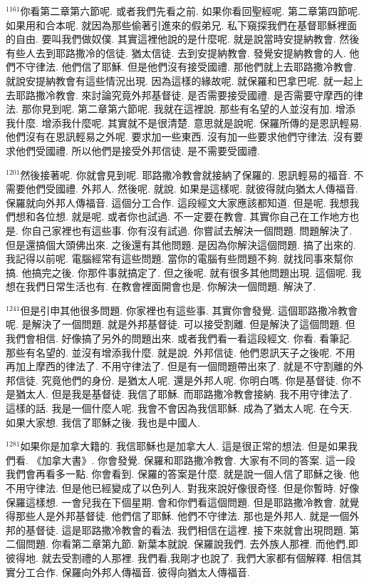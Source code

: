\documentclass{book}
\begin{document}
$^{1161}$你看第二章第六節呢.
或者我們先看之前.
如果你看回聖經呢.
第二章第四節呢.
如果用和合本呢.
就因為那些偷著引進來的假弟兄.
私下窺探我們在基督耶穌裡面的自由.
要叫我們做奴僕.
其實這裡他說的是什麼呢.
就是說當時安提納教會.
然後有些人去到耶路撒冷的信徒.
猶太信徒.
去到安提納教會.
發覺安提納教會的人.
他們不守律法.
他們信了耶穌.
但是他們沒有接受國禮.
那他們就上去耶路撒冷教會.
就說安提納教會有這些情況出現.
因為這樣的緣故呢.
就保羅和巴拿巴呢.
就一起上去耶路撒冷教會.
來討論究竟外邦基督徒.
是否需要接受國禮.
是否需要守摩西的律法.
那你見到呢.
第二章第六節呢.
我就在這裡說.
那些有名望的人並沒有加.
增添我什麼.
增添我什麼呢.
其實就不是很清楚.
意思就是說呢.
保羅所傳的是恩訊輕易.
他們沒有在恩訊輕易之外呢.
要求加一些東西.
沒有加一些要求他們守律法.
沒有要求他們受國禮.
所以他們是接受外邦信徒.
是不需要受國禮.

$^{1201}$然後接著呢.
你就會見到呢.
耶路撒冷教會就接納了保羅的.
恩訊輕易的福音.
不需要他們受國禮.
外邦人.
然後呢.
就說.
如果是這樣呢.
就彼得就向猶太人傳福音.
保羅就向外邦人傳福音.
這個分工合作.
這段經文大家應該都知道.
但是呢.
我想我們想和各位想.
就是呢.
或者你也試過.
不一定要在教會.
其實你自己在工作地方也是.
你自己家裡也有這些事.
你有沒有試過.
你嘗試去解決一個問題.
問題解決了.
但是還搞個大頭佛出來.
之後還有其他問題.
是因為你解決這個問題.
搞了出來的.
我記得以前呢.
電腦經常有這些問題.
當你的電腦有些問題不夠.
就找同事來幫你搞.
他搞完之後.
你那件事就搞定了.
但之後呢.
就有很多其他問題出現.
這個呢.
我想在我們日常生活也有.
在教會裡面開會也是.
你解決一個問題.
解決了.

$^{1241}$但是引申其他很多問題.
你家裡也有這些事.
其實你會發覺.
這個耶路撒冷教會呢.
是解決了一個問題.
就是外邦基督徒.
可以接受割離.
但是解決了這個問題.
但我們會相信.
好像搞了另外的問題出來.
或者我們看一看這段經文.
你看.
看筆記.
那些有名望的.
並沒有增添我什麼.
就是說.
外邦信徒.
他們恩訊天子之後呢.
不用再加上摩西的律法了.
不用守律法了.
但是有一個問題帶出來了.
就是不守割離的外邦信徒.
究竟他們的身份.
是猶太人呢.
還是外邦人呢.
你明白嗎.
你是基督徒.
你不是猶太人.
但是我是基督徒.
我信了耶穌.
而耶路撒冷教會接納.
我不用守律法了.
這樣的話.
我是一個什麼人呢.
我會不會因為我信耶穌.
成為了猶太人呢.
在今天.
如果大家想.
我信了耶穌之後.
我也是中國人.

$^{1281}$如果你是加拿大籍的.
我信耶穌也是加拿大人.
這是很正常的想法.
但是如果我們看.
《加拿大書》.
你會發覺.
保羅和耶路撒冷教會.
大家有不同的答案.
這一段我們會再看多一點.
你會看到.
保羅的答案是什麼.
就是說一個人信了耶穌之後.
他不用守律法.
但是他已經變成了以色列人.
對我來說好像很奇怪.
但是你暫時.
好像保羅這樣想.
一會兒我在下個星期.
會和你們看這個問題.
但是耶路撒冷教會.
就覺得那些人是外邦基督徒.
他們信了耶穌.
他們不守律法.
那也是外邦人.
就是一個外邦的基督徒.
這是耶路撒冷教會的看法.
我們相信在這裡.
接下來就會出現問題.
第二個問題.
你看第二章第九節.
新葉本就說.
保羅說我們.
去外族人那裡.
而他們,即彼得地.
就去受割禮的人那裡.
我們看,我剛才也說了.
我們大家都有個解釋.
相信其實分工合作.
保羅向外邦人傳福音.
彼得向猶太人傳福音.
\end{document}
